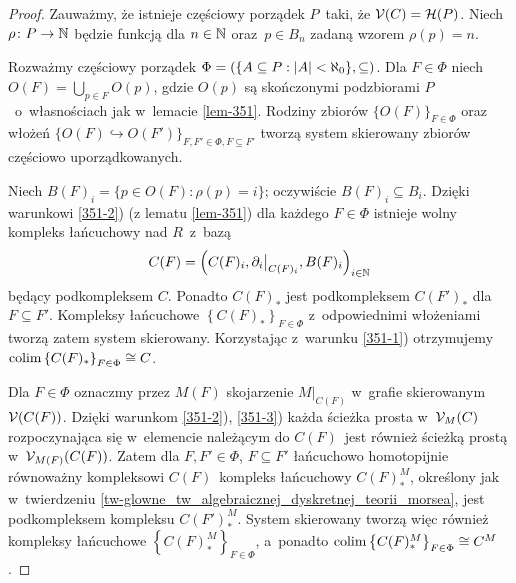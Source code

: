 \begin{proof}
Zauważmy, że istnieje częściowy porządek $P$~taki, że $\mathcal{V}(C)=\mathcal{H}(P)$. Niech $\rho\colon P\to \mathbb{N}$ będzie funkcją dla $n\in\mathbb{N}$ oraz~$p\in B_n$ zadaną wzorem $\rho(p)=n$. 

Rozważmy częściowy porządek $\Phi=\left(\{A\subseteq P: \left|A\right|<\aleph_0\},\subseteq\right)$. Dla $F\in \Phi$ niech $O(F)=\bigcup_{p\in F}O(p)$, gdzie $O(p)$ są skończonymi podzbiorami $P$~o~własnościach jak w~lemacie \ref{lem-351}. Rodziny zbiorów $\{O(F)\}_{F\in \Phi}$ oraz włożeń \mbox{$\{O(F)\hookrightarrow O(F')\}_{F,F'\in\Phi, F\subseteq F'}$} tworzą system skierowany zbiorów częściowo uporządkowanych.

Niech $B(F)_i=\{p\in O(F):\rho(p)=i\}$; oczywiście $B(F)_i\subseteq B_i$. Dzięki warunkowi \ref{351-2}) (z lematu \ref{lem-351}) dla każdego $F\in \Phi$ istnieje wolny kompleks łańcuchowy nad $R$~z~bazą \[C(F)=\left(C(F)_i,\partial_i\big|_{C(F)_i}, B(F)_i\right)_{i\in\mathbb{N}}\] będący podkompleksem $C$. Ponadto $C(F)_*$ jest podkompleksem $C(F')_*$ dla $F\subseteq F'$. Kompleksy łańcuchowe $\left\{C(F)_*\right\}_{F\in\Phi}$ z~odpowiednimi włożeniami tworzą zatem system skierowany. Korzystając z~warunku \ref{351-1}) otrzymujemy $\operatorname{colim}\left\{C(F)_*\right\}_{F\in\Phi}\cong C$.

Dla $F\in\Phi$ oznaczmy przez $M(F)$ skojarzenie $M\big|_{C(F)}$ w~grafie skierowanym $\mathcal{V}(C(F))$. Dzięki warunkom \ref{351-2}), \ref{351-3}) każda ścieżka prosta w~$\mathcal{V}_M(C)$ rozpoczynająca się w~elemencie należącym do $C(F)$~jest również ścieżką prostą w~$\mathcal{V}_{M(F)}(C(F))$. Zatem dla $F,F'\in \Phi$, $F\subseteq F'$ łańcuchowo homotopijnie równoważny kompleksowi $C(F)$~kompleks łańcuchowy $C(F)^M_*$, określony jak w~twierdzeniu \ref{tw-glowne_tw_algebraicznej_dyskretnej_teorii_morsea}, jest podkompleksem kompleksu $C(F')_*^M$. System skierowany tworzą więc również kompleksy łańcuchowe $\left\{C(F)^M_*\right\}_{F\in\Phi}$, a~ponadto $\operatorname{colim}\left\{C(F)^M_*\right\}_{F\in\Phi}\cong C^M$.


\end{proof}
